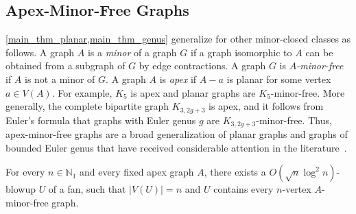 \documentclass{patmorin}
\newcommand{\defin}[1]{\emph{\textcolor{brightmaroon}{#1}}}
\newcommand{\NN}{\mathbb{N}}
\begin{document}

%



\subsection{Apex-Minor-Free Graphs}

\cref{main_thm_planar,main_thm_genus} generalize for other minor-closed classes as follows. A graph $A$ is a \defin{minor} of a graph $G$ if a graph isomorphic to $A$ can be obtained from a subgraph of $G$ by edge contractions. A graph $G$ is \defin{$A$-minor-free} if $A$ is not a minor of $G$. A graph $A$ is \defin{apex} if $A-a$ is planar for some vertex $a\in V(A)$.  
For example, $K_5$ is apex and planar graphs are $K_5$-minor-free. More generally, the complete bipartite graph $K_{3,2g+3}$ is apex, and it follows from Euler's formula that graphs with Euler genus $g$ are $K_{3,2g+3}$-minor-free. Thus, apex-minor-free graphs are a broad generalization of planar graphs and graphs of bounded Euler genus that have received considerable attention in the literature~\citep{DH-Algo04,Eppstein-Algo00,demaine.hajiaghayi.ea:approximation,dragan.fomin.ea:ptas,fomin.lokshtanov.ea:subexponetial,dvorak.thomas:list,korhonen.nadara.ea:fully}.


\begin{thm}\label{main_thm_apexmf}
    For every $n\in\NN_1$ and every fixed apex graph $A$, there exists a $O( \sqrt{n}\log^2 n )$-blowup $U$ of a fan, such  that $|V(U)|=n$ and $U$ contains every $n$-vertex $A$-minor-free graph.
\end{thm}
\end{document}
